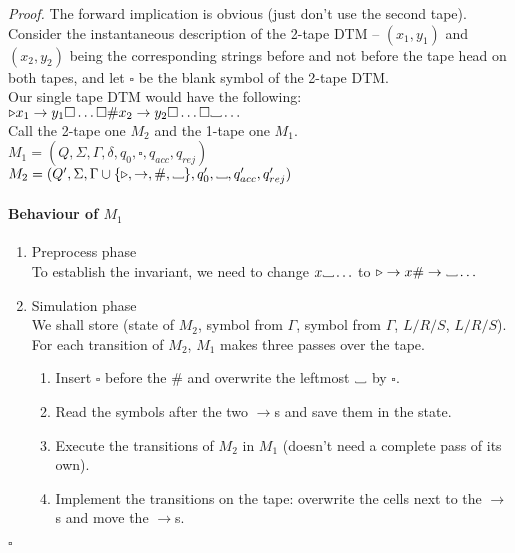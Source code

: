 \documentclass[a4paper]{article}
\newenvironment{proof}{\begin{breakbox}\textit{Proof.}}{\hfill$\square$\end{breakbox}}
\newcommand{\nl}{\vspace{0.2cm}\\}
\newcommand\Vtextvisiblespace[1][.3em]{%
    \mbox{\kern.06em\vrule height.3ex}%
    \vbox{\hrule width#1}%
    \hbox{\vrule height.3ex}
}
\newcommand{\blank}{{\Vtextvisiblespace[0.7em]}}
\newcommand{\leftend}{\triangleright}
\begin{document}
    \begin{proof}
        The forward implication is obvious (just don't use the second tape).\nl
        Consider the instantaneous description of the 2-tape DTM -- $(x_1, y_1)$ and $(x_2, y_2)$ being the corresponding strings before and not before the tape head on both tapes, and let
        $\square$ be the blank symbol of the 2-tape DTM.\nl
        Our single tape DTM would have the following:
        $\leftend x_1 \to y_1 \square \ldots \square \# x_2 \to y_2 \square \ldots \square 
        \blank \ldots $\nl
        Call the 2-tape one $M_2$ and the 1-tape one $M_1$.\nl
        $M_1 = (Q, \Sigma, \Gamma, \delta, q_0, \square, q_{acc}, q_{rej})$\nl
        $M_2 = (Q', \Sigma, \Gamma \cup \{\leftend, \to, \#, \blank\}, q_0', \blank, q_{acc}', q_{rej}')$\nl
        \paragraph{Behaviour of $M_1$}
        \begin{enumerate}
            \item Preprocess phase\nl
                To establish the invariant, we need to change $x \blank \ldots $ to $\leftend \to x \# \to \blank \ldots$
            \item Simulation phase\nl
                We shall store (state of $M_2$, symbol from $\Gamma$, symbol from $\Gamma$, $L/R/S$, $L/R/S$).\nl
                For each transition of $M_2$, $M_1$ makes three passes over the tape.
                \begin{enumerate}
                    \item Insert $\square$ before the $\#$ and overwrite the leftmost $\blank$ by $\square$.
                    \item Read the symbols after the two $\to$s and save them in the state.
                    \item Execute the transitions of $M_2$ in $M_1$ (doesn't need a complete pass of its own).
                    \item Implement the transitions on the tape: overwrite the cells next to the $\to$s and move the $\to$s.
                \end{enumerate}
        \end{enumerate}
    \end{proof}

    
\end{document}
